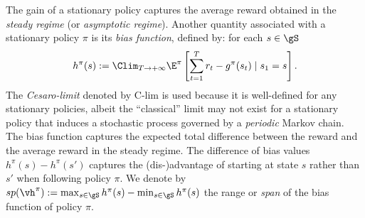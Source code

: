 The gain of a stationary policy captures the average reward obtained in the \emph{steady regime} (or \emph{asymptotic regime}).
Another quantity associated with a stationary policy $\pi$ is its \emph{bias function}, defined by: for each $s\in\gS$
\begin{equation}
    \label{eq:bias_defn}
    h^\pi(s) :=\Clim_{T\to+\infty} \E^\pi\left[ \sum_{t=1}^{T} r_t -g^\pi(s_t) \mid s_1=s\right].
\end{equation}
The \emph{Cesaro-limit} denoted by $\mathrm{C}$-$\mathrm{lim}$ is used because it is well-defined for any stationary policies, albeit the ``classical'' limit may not exist for a stationary policy that induces a stochastic process governed by a \emph{periodic} Markov chain.
The bias function captures the expected total difference between the reward and the average reward in the steady regime. 
The difference of bias values $h^\pi(s)-h^\pi(s')$ captures the (dis-)advantage of starting at state $s$ rather than $s'$ when following policy $\pi$.
We denote by $sp(\vh^\pi):=\max_{s\in\gS}h^\pi(s) -\min_{s\in\gS}h^\pi(s)$ the range or \emph{span} of the bias function of policy $\pi$.

